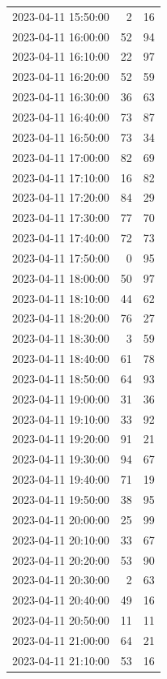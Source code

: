 \documentclass[
  letterpaper,
  DIV=11,
  numbers=noendperiod]{scrartcl}
\begin{document}
\begin{tabular}{lrr}
2023-04-11 15:50:00 &     2 &    16 \\
2023-04-11 16:00:00 &    52 &    94 \\
2023-04-11 16:10:00 &    22 &    97 \\
2023-04-11 16:20:00 &    52 &    59 \\
2023-04-11 16:30:00 &    36 &    63 \\
2023-04-11 16:40:00 &    73 &    87 \\
2023-04-11 16:50:00 &    73 &    34 \\
2023-04-11 17:00:00 &    82 &    69 \\
2023-04-11 17:10:00 &    16 &    82 \\
2023-04-11 17:20:00 &    84 &    29 \\
2023-04-11 17:30:00 &    77 &    70 \\
2023-04-11 17:40:00 &    72 &    73 \\
2023-04-11 17:50:00 &     0 &    95 \\
2023-04-11 18:00:00 &    50 &    97 \\
2023-04-11 18:10:00 &    44 &    62 \\
2023-04-11 18:20:00 &    76 &    27 \\
2023-04-11 18:30:00 &     3 &    59 \\
2023-04-11 18:40:00 &    61 &    78 \\
2023-04-11 18:50:00 &    64 &    93 \\
2023-04-11 19:00:00 &    31 &    36 \\
2023-04-11 19:10:00 &    33 &    92 \\
2023-04-11 19:20:00 &    91 &    21 \\
2023-04-11 19:30:00 &    94 &    67 \\
2023-04-11 19:40:00 &    71 &    19 \\
2023-04-11 19:50:00 &    38 &    95 \\
2023-04-11 20:00:00 &    25 &    99 \\
2023-04-11 20:10:00 &    33 &    67 \\
2023-04-11 20:20:00 &    53 &    90 \\
2023-04-11 20:30:00 &     2 &    63 \\
2023-04-11 20:40:00 &    49 &    16 \\
2023-04-11 20:50:00 &    11 &    11 \\
2023-04-11 21:00:00 &    64 &    21 \\
2023-04-11 21:10:00 &    53 &    16 \\

\end{tabular}
\end{document}

